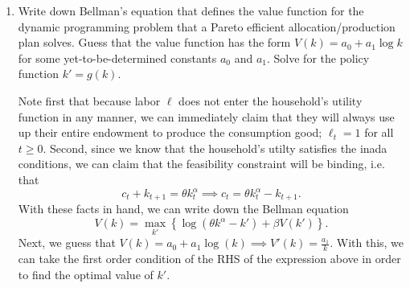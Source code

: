 \documentclass[11pt,english]{article}
\begin{document}
\begin{enumerate}[label=(\alph*)]
\begin{solution}
From the inherent definition of optimization problems, if $$\sum_{t = 0}^\infty \beta^t \hat{c}_t < \sum_{t = 0}^\infty \bar{c}_t$$ then we must have that $$\sum_{t =0}^\infty \hat{p}_t (\bar{c}_t  + \hat{k}_{t+1} - (1 - \delta)\hat{k}_t) > \sum_{t=0}^\infty \hat{r}_t \bar{k}_t + \hat{w}_t\bar{\ell}_t,$$ because if otherwise, then the bar allocations would have solved the optimization problem instead of the hat allocations. 

Now, assuming that the firm has the same CRS production as in the feasibility constraint and using the fact that we are assuming competitive markets in which the firm makes 0 profit at equilibrium, we know that $$\pi_t(\bar{k}_t^f, \bar{\ell}_t^f) = \hat{p}_t\theta (\bar{k}_t^f)^\alpha (\bar{\ell}_t^f)^{1 - \alpha} -   \hat{r}_t \bar{k}_t - \hat{w}_t\bar{\ell}_t\leq 0$$ from the optimality of $\hat{k}_t^f, \hat{\ell}_t^f$. This then let's us write (also assuming that $\delta = 1$)
$$\sum_{t =0}^\infty \hat{p}_t (\bar{c}_t  + \bar{k}_{t+1}) > \sum_{t=0}^\infty \hat{r}_t \bar{k}_t + \hat{w}_t\bar{\ell}_t \geq \sum_{t=0}^\infty \hat{p}_t\theta (\bar{k}_t^f)^\alpha (\bar{\ell}_t^f)^{1 - \alpha} = \sum_{t=0}^\infty \hat{p}_t\theta \bar{k}_t^\alpha \bar{\ell}_t^{1 - \alpha}.$$ This, however, implies that $\bar{c}_t  + \bar{k}_{t+1} > \theta \bar{k}_t^\alpha \bar{\ell}_t^{1 - \alpha}$ which violates the feasibility constraint. We have thus reached a contradiction and indeed it must be that the AD equilibrium is pareto efficient.
\end{solution}
    \item Write down Bellman's equation that defines the value function for the dynamic programming problem that a Pareto efficient allocation/production plan solves. Guess that the value function has the form $V(k) = a_0 + a_1 \log k$ for some yet-to-be-determined constants $a_0$ and $a_1$. Solve for the policy function $k' = g(k)$.
\begin{solution}
Note first that because labor $\ell$ does not enter the household's utility function in any manner, we can immediately claim that they will always use up their entire endowment to produce the consumption good; $\ell_t = 1$ for all $t\geq 0$. Second, since we know that the household's utilty satisfies the inada conditions, we can claim that the feasibility constraint will be binding, i.e. that $$c_t + k_{t+1} = \theta k_t^\alpha \implies c_t = \theta k_t^\alpha - k_{t+1}.$$ With these facts in hand, we can write down the Bellman equation $$\boxed{V(k) = \max_{k'}\left\{\log(\theta k^\alpha - k') + \beta V(k')\right\}.}$$ Next, we guess that $V(k) = a_0 + a_1\log(k) \implies V'(k) = \frac{a_1}{k}$. With this, we can take the first order condition of the RHS of the expression above in order to find the optimal value of $k'$.  

\end{solution}
\end{enumerate}
\end{document}
